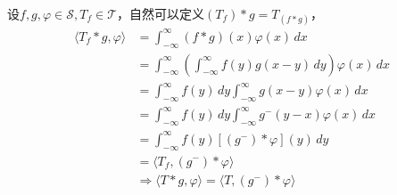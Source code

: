 \documentclass{ctexbook}
\begin{document}
设$f,g,\varphi\in\mathcal{S} ,T_f\in\mathcal{T} $，自然可以定义$(T_f)*g=T_{(f*g)}$，
\begin{align*}
    \langle T_f*g,\varphi\rangle & =\int_{-\infty}^{\infty}(f*g)(x)\varphi(x)\,dx                                                      \\
                                 & =\int_{-\infty}^{\infty}\left(\int_{-\infty}^{\infty}f(y)g(x-y)\,dy\right)\varphi(x)\,dx            \\
                                 & =\int_{-\infty}^{\infty}f(y)\,dy\int_{-\infty}^{\infty}g(x-y)\varphi(x)\,dx                         \\
                                 & =\int_{-\infty}^{\infty}f(y)\,dy\int_{-\infty}^{\infty}g^- (y-x)\varphi(x)\,dx                      \\
                                 & =\int_{-\infty}^{\infty}f(y)[(g^-) *\varphi](y)\,dy                                                 \\
                                 & =\langle T_f,(g^-)*\varphi\rangle                                                                   \\
                                 & \Rightarrow \langle T*g,\varphi\rangle=\langle T,(g^-)*\varphi\rangle
\end{align*}
\end{document}
